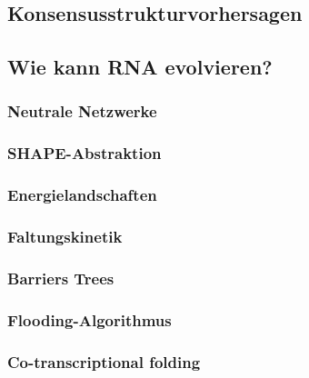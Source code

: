 \documentclass[12pt,a4paper]{article}
\begin{document}
\subsection{Konsensusstrukturvorhersagen}

\subsection{Wie kann RNA evolvieren?}

\subsubsection{Neutrale Netzwerke}

\subsubsection{SHAPE-Abstraktion}

\subsubsection{Energielandschaften}

\subsubsection{Faltungskinetik}

\subsubsection{Barriers Trees}

\subsubsection{Flooding-Algorithmus}

\subsubsection{Co-transcriptional folding}
\end{document}
